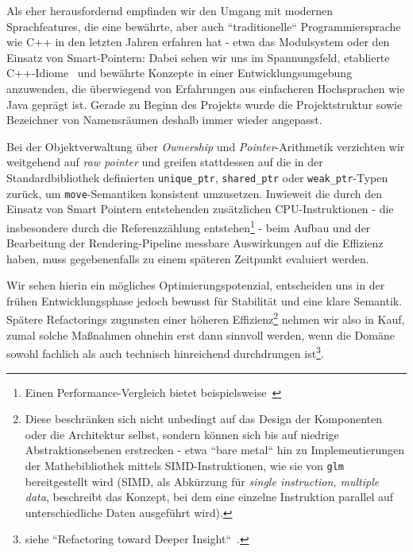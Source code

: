 Als eher herausfordernd empfinden wir den Umgang mit modernen Sprachfeatures, die eine bewährte, aber auch ``traditionelle`` Programmiersprache wie C++ in den letzten Jahren erfahren hat - etwa das Modulsystem oder den Einsatz von Smart-Pointern: Dabei sehen wir uns im Spannungsfeld, etablierte C++-Idiome~\cite[]{IdiomaticCpp} und bewährte Konzepte in einer Entwicklungsumgebung anzuwenden, die überwiegend von Erfahrungen aus einfacheren Hochsprachen wie Java geprägt ist.
Gerade zu Beginn des Projekts wurde die Projektstruktur sowie Bezeichner von Namensräumen deshalb immer wieder angepasst.\par

Bei der Objektverwaltung über \textit{Ownership} und \textit{Pointer}-Arithmetik verzichten wir weitgehend auf \textit{raw pointer} und greifen stattdessen auf die in der Standardbibliothek definierten \texttt{unique\_ptr}, \texttt{shared\_ptr} oder \texttt{weak\_ptr}-Typen zurück, um \texttt{move}-Semantiken konsistent umzusetzen.
Inwieweit die durch den Einsatz von Smart Pointern entstehenden zusätzlichen CPU-Instruktionen - die insbesondere durch die Referenzzählung entstehen\footnote{Einen Performance-Vergleich bietet beispielsweise~\cite[]{Val25}} - beim Aufbau und der Bearbeitung der Rendering-Pipeline messbare Auswirkungen auf die Effizienz haben, muss gegebenenfalls zu einem späteren Zeitpunkt evaluiert werden.\par

Wir sehen hierin ein mögliches Optimierungspotenzial, entscheiden uns in der frühen Entwicklungsphase jedoch bewusst für Stabilität und eine klare Semantik.
Spätere  Refactorings zugunsten einer höheren Effizienz\footnote{
Diese beschränken sich nicht unbedingt auf das Design der Komponenten oder die Architektur selbst, sondern können sich bis auf niedrige Abstraktionsebenen erstrecken - etwa ``bare metal`` hin zu Implementierungen der Mathebibliothek mittels SIMD-Instruktionen, wie sie von \texttt{glm}~\cite[]{glmSimd} bereitgestellt wird (SIMD, als Abkürzung für \textit{single instruction, multiple data}, beschreibt das Konzept, bei dem eine einzelne Instruktion parallel auf unterschiedliche Daten ausgeführt wird).
} nehmen wir also in Kauf, zumal solche Maßnahmen ohnehin erst dann sinnvoll werden, wenn die Domäne sowohl fachlich als auch technisch hinreichend durchdrungen ist\footnote{
   siehe ``Refactoring toward Deeper Insight``~\cite[]{Eva03}.
}.\par


